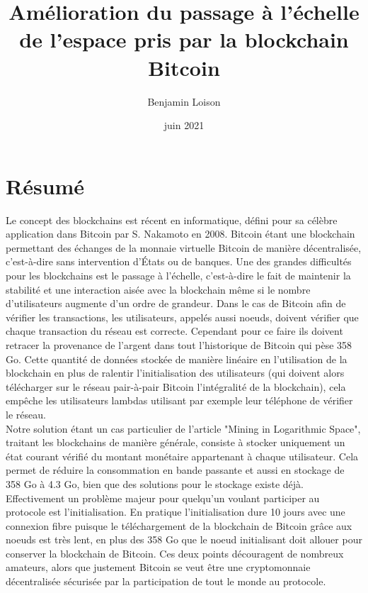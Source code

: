 \documentclass[12pt,a4paper]{article}
\begin{document}
	\title{Amélioration du passage à l'échelle de l'espace pris par la blockchain Bitcoin} %
	\author{Benjamin Loison}
	\date{juin 2021}
	\maketitle

	
	\section{Résumé}
	
	Le concept des blockchains est récent en informatique, défini pour sa célèbre application dans Bitcoin par S. Nakamoto en 2008. Bitcoin étant une blockchain permettant des échanges de la monnaie virtuelle Bitcoin de manière décentralisée, c'est-à-dire sans intervention d'États ou de banques. Une des grandes difficultés pour les blockchains est le passage à l'échelle, c'est-à-dire le fait de maintenir la stabilité et une interaction aisée avec la blockchain même si le nombre d'utilisateurs augmente d'un ordre de grandeur. Dans le cas de Bitcoin afin de vérifier les transactions, les utilisateurs, appelés aussi noeuds, doivent vérifier que chaque transaction du réseau est correcte. Cependant pour ce faire ils doivent retracer la provenance de l'argent dans tout l'historique de Bitcoin qui pèse 358 Go. Cette quantité de données stockée de manière linéaire en l'utilisation de la blockchain en plus de ralentir l'initialisation des utilisateurs (qui doivent alors télécharger sur le réseau pair-à-pair Bitcoin l'intégralité de la blockchain), cela empêche les utilisateurs lambdas utilisant par exemple leur téléphone de vérifier le réseau.\\
  Notre solution étant un cas particulier de l'article "Mining in Logarithmic Space", traitant les blockchains de manière générale, consiste à stocker uniquement un état courant vérifié du montant monétaire appartenant à chaque utilisateur. Cela permet de réduire la consommation en bande passante et aussi en stockage de 358 Go à 4.3 Go, bien que des solutions pour le stockage existe déjà. Effectivement un problème majeur pour quelqu'un voulant participer au protocole est l'initialisation. En pratique l'initialisation dure 10 jours avec une connexion fibre puisque le téléchargement de la blockchain de Bitcoin grâce aux noeuds est très lent, en plus des 358 Go que le noeud initialisant doit allouer pour conserver la blockchain de Bitcoin. Ces deux points découragent de nombreux amateurs, alors que justement Bitcoin se veut être une cryptomonnaie décentralisée sécurisée par la participation de tout le monde au protocole.\\
\end{document}
